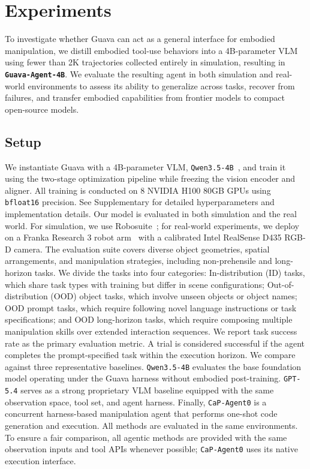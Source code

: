 \section{Experiments}

To investigate whether Guava can act as a general interface for embodied manipulation, we distill embodied tool-use behaviors into a 4B-parameter VLM using fewer than 2K trajectories collected entirely in simulation, resulting in \texttt{\textbf{Guava-Agent-4B}}. We evaluate the resulting agent in both simulation and real-world environments to assess its ability to generalize across tasks, recover from failures, and transfer embodied capabilities from frontier models to compact open-source models.

\vspace{-2mm}
\subsection{Setup}
We instantiate Guava with a 4B-parameter VLM, \texttt{Qwen3.5-4B}~\citep{qwen2026qwen35}, and train it using the two-stage optimization pipeline while freezing the vision encoder and aligner. All training is conducted on 8 NVIDIA H100 80GB GPUs using \texttt{bfloat16} precision. See Supplementary for detailed hyperparameters and implementation details.
Our model is evaluated in both simulation and the real world. For simulation, we use Robosuite~\citep{robosuite2020}; for real-world experiments, we deploy on a Franka Research 3 robot arm~\citep{franka_research_3} with a calibrated Intel RealSense D435 RGB-D camera.
The evaluation suite covers diverse object geometries, spatial arrangements, and manipulation strategies, including non-prehensile and long-horizon tasks.
We divide the tasks into four categories: In-distribution (ID) tasks, which share task types with training but differ in scene configurations; Out-of-distribution (OOD) object tasks, which involve unseen objects or object names; OOD prompt tasks, which require following novel language instructions or task specifications; and OOD long-horizon tasks, which require composing multiple manipulation skills over extended interaction sequences.
We report task success rate as the primary evaluation metric. A trial is considered successful if the agent completes the prompt-specified task within the execution horizon. 
We compare against three representative baselines. \texttt{Qwen3.5-4B} evaluates the base foundation model operating under the Guava harness without embodied post-training. \texttt{GPT-5.4} serves as a strong proprietary VLM baseline equipped with the same observation space, tool set, and agent harness. Finally, \texttt{CaP-Agent0} is a concurrent harness-based manipulation agent that performs one-shot code generation and execution. All methods are evaluated in the same environments. To ensure a fair comparison, all agentic methods are provided with the same observation inputs and tool APIs whenever possible; \texttt{CaP-Agent0} uses its native execution interface.



